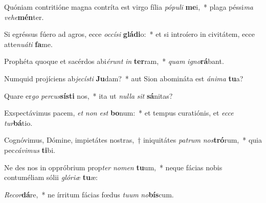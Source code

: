 \item Quóniam contritióne magna contríta est virgo fília \textit{pó}\textit{pu}\textit{li} \textbf{me}i,~* plaga péssi\textit{ma} \textit{ve}\textit{he}\textbf{mén}ter.
\item Si egréssus fúero ad agros, ecce \textit{oc}\textit{cí}\textit{si} \textbf{glá}\textbf{di}o:~* et si introíero in civitátem, ecce atte\textit{nu}\textit{á}\textit{ti} \textbf{fa}me.
\item Prophéta quoque et sacérdos abi\textit{é}\textit{runt} \textit{in} \textbf{ter}ram,~* \textit{quam} \textit{i}\textit{gno}\textbf{rá}bant.
\item Numquid projíciens ab\textit{je}\textit{cís}\textit{ti} \textbf{Ju}dam?~* aut Sion abomináta est \textit{á}\textit{ni}\textit{ma} \textbf{tu}a?
\item Quare er\textit{go} \textit{per}\textit{cus}\textbf{sís}\textbf{ti} nos,~* ita ut \textit{nul}\textit{la} \textit{sit} \textbf{sá}nitas?
\item Exspectávimus pacem, \textit{et} \textit{non} \textit{est} \textbf{bo}num:~* et tempus curatiónis, et \textit{ec}\textit{ce} \textit{tur}\textbf{bá}tio.
\item Cognóvimus, Dómine, impietátes nostras,~† iniquitátes \textit{pa}\textit{trum} \textit{nos}\textbf{tró}rum,~* quia pec\textit{cá}\textit{vi}\textit{mus} \textbf{ti}bi.
\item Ne des nos in oppróbrium prop\textit{ter} \textit{no}\textit{men} \textbf{tu}um,~* neque fácias nobis contuméliam sólii \textit{gló}\textit{ri}\textit{æ} \textbf{tu}æ:
\item \textit{Re}\textit{cor}\textbf{dá}re,~* ne írritum fácias fœdus \textit{tu}\textit{um} \textit{no}\textbf{bís}cum.

